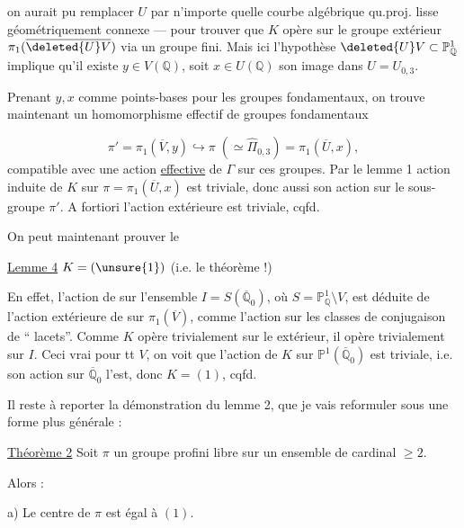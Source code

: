 \unsure{(} on aurait pu remplacer $U$ par n'importe quelle courbe algébrique qu.proj. lisse géométriquement connexe --- pour trouver que $K$ opère sur le groupe extérieur $\pi_1(\overline{\deleted{U}V})$ via un groupe fini. Mais ici l'hypothèse $\deleted{U}V\subset\mathbb P^1_{\mathbb Q}$ implique qu'il existe $y\in V(\mathbb Q)$, soit $x\in U(\mathbb Q)$ son image dans $U=U_{0,3}$.

Prenant  $y,x$ comme points-bases pour les groupes fondamentaux, on trouve maintenant un homomorphisme effectif de groupes fondamentaux

\[
\pi'=\pi_1(\overline V,y)\hookrightarrow
\pi\;(\simeq\widehat{\Pi}_{0,3})=\pi_1(\overline U,x),
\]
compatible avec une action \uline{effective} de $\Gamma$ sur ces groupes. Par le lemme 1
action induite de $K$ sur $\pi=\pi_1(\overline U,x)$ est triviale,
donc aussi son action sur le sous-groupe $\pi'$. A fortiori l'action extérieure est triviale, cqfd.

On peut maintenant prouver le

\uline{Lemme 4} $K=(\unsure{1})$ (i.e. le théorème !)

En effet,  l'action de
\deleted{\unsure{$\Gamma$}} sur l'ensemble
$I=S(\overline{\mathbb Q}_0)$, où $S=\mathbb P^1_{\mathbb Q}\setminus V$,
est déduite de l'action extérieure de
\deleted{\unsure{$\Gamma$}} sur $\pi_1(\overline V)$,
 comme l'action sur les classes de conjugaison de
`` lacets''. Comme $K$ opère trivialement sur le  extérieur,
il opère trivialement sur $I$. Ceci  vrai pour tt $V$, on voit que l'action de $K$
sur $\mathbb P^1(\overline{\mathbb Q}_0)$
est triviale, i.e. son action sur $\overline{\mathbb Q}_0$ l'est,
donc $K=(1)$, cqfd.


Il reste à reporter la démonstration du lemme 2, que je vais reformuler sous une forme plus générale :

\uline{Théorème 2} Soit $\pi$ un groupe profini libre sur un ensemble  de cardinal $\geq 2$.

Alors :

a) Le centre de $\pi$ est  égal à $(1)$.


